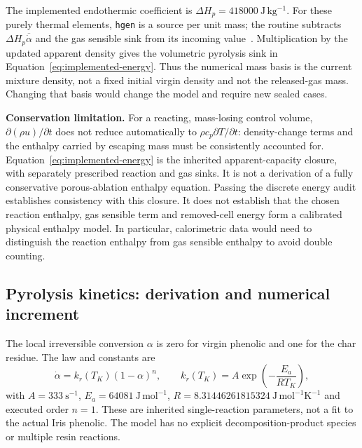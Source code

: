 \documentclass[oneside,openany]{amsdtx}
\begin{document}
The implemented endothermic coefficient is $\Delta H_p=418000\ \mathrm{J\,kg^{-1}}$. For these purely thermal elements, \texttt{hgen} is a source per unit mass; the routine subtracts $\Delta H_p\overline{\dot\alpha}$ and the gas sensible sink from its incoming value~\cite{ansysusermat}. Multiplication by the updated apparent density gives the volumetric pyrolysis sink in Equation~\eqref{eq:implemented-energy}. Thus the numerical mass basis is the current mixture density, not a fixed initial virgin density and not the released-gas mass. Changing that basis would change the model and require new sealed cases.

\textbf{Conservation limitation.} For a reacting, mass-losing control volume, $\partial(\rho u)/\partial t$ does not reduce automatically to $\rho c_p\partial T/\partial t$: density-change terms and the enthalpy carried by escaping mass must be consistently accounted for. Equation~\eqref{eq:implemented-energy} is the inherited apparent-capacity closure, with separately prescribed reaction and gas sinks. It is not a derivation of a fully conservative porous-ablation enthalpy equation. Passing the discrete energy audit establishes consistency with this closure. It does not establish that the chosen reaction enthalpy, gas sensible term and removed-cell energy form a calibrated physical enthalpy model. In particular, calorimetric data would need to distinguish the reaction enthalpy from gas sensible enthalpy to avoid double counting.

\subsection{Pyrolysis kinetics: derivation and numerical increment}
The local irreversible conversion $\alpha$ is zero for virgin phenolic and one for the char residue. The law and constants are
\begin{equation}
 \dot\alpha=k_r(T_K)(1-\alpha)^n,\qquad
 k_r(T_K)=A\exp\!\left(-\frac{E_a}{RT_K}\right),
\end{equation}
with $A=333\ \mathrm{s^{-1}}$, $E_a=64081\ \mathrm{J\,mol^{-1}}$, $R=8.31446261815324\ \mathrm{J\,mol^{-1}K^{-1}}$ and executed order $n=1$. These are inherited single-reaction parameters, not a fit to the actual Iris phenolic. The model has no explicit decomposition-product species or multiple resin reactions.
\end{document}
